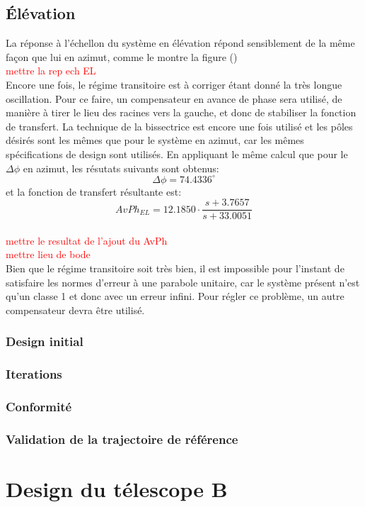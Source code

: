 \documentclass{udes_rapport} %
\begin{document}
\subsection{Élévation}
La réponse à l'échellon du système en élévation répond sensiblement de la même façon que lui en azimut, comme le montre la figure ()
\\
\textcolor{red}{mettre la rep ech EL}
\\
Encore une fois, le régime transitoire est à corriger étant donné la très longue oscillation. Pour ce faire, un compensateur en avance de phase sera utilisé, de manière à tirer le lieu des racines vers la gauche, et donc de stabiliser la fonction de transfert. La technique de la bissectrice est encore une fois utilisé et les pôles désirés sont les mêmes que pour le système en azimut, car les mêmes spécifications de design sont utilisés. En appliquant le même calcul que pour le $\Delta \phi$ en azimut, les résutats suivants sont obtenus:
\[\Delta \phi = 74.4336^\circ\]
et la fonction de transfert résultante est:
\[AvPh_{EL} = 12.1850 \cdot \frac{s+3.7657}{s+33.0051}\]
\\
\textcolor{red}{mettre le resultat  de l'ajout du AvPh}
\\
\textcolor{red}{mettre lieu de bode}
\\
Bien que le régime transitoire soit très bien, il est impossible pour l'instant de satisfaire les normes d'erreur à une parabole unitaire, car le système présent n'est qu'un classe 1 et donc avec un erreur infini. Pour régler ce problème, un autre compensateur devra être utilisé.
\subsubsection{Design initial}
\subsubsection{Iterations}

\subsubsection{Conformité}
\subsubsection{Validation de la trajectoire de référence}
\section{Design du télescope B}
\end{document}
